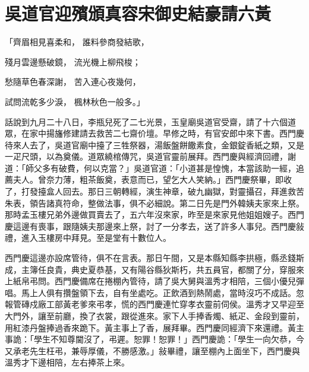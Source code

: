 %

\chapter{吳道官迎殯頒真容\KG 宋御史結豪請六黃}

「齊眉相見喜柔和，  誰料參商發結歌，

殘月雲邊懸破鏡，  流光機上柳飛梭；

愁隨草色春深謝，  苦入連心夜幾何，

試問流乾多少淚，  楓林秋色一般多。」

話說到九月二十八日，李瓶兒死了二七光景，玉皇廟吳道官受齋，請了十六個道眾，在家中揚旛修建請去救苦二七齋价壇。早修之時，有官安郎中來下書。西門慶待來人去了，吳道官廟中擡了三牲祭器，湯飯盤餅饊素食，金銀錠香紙之類，又是一疋尺頭，以為奠儀。道眾繞棺傳咒，吳道官靈前展拜。西門慶與經濟回禮，謝道：「師父多有破費，何以克當？」吳道官道：「小道甚是惶愧，本當該助一經，追薦夫人。曾奈力薄，粗茶飯奠，表意而已，望乞大人笑納。」西門慶祭畢，即收了，打發擡盒人回去。那日三朝轉經，演生神章，破九幽獄，對靈攝召，拜進救苦朱表，領告諸真符命，整做法事，俱不必細說。第二日先是門外韓姨夫家來上祭。那時孟玉樓兄弟外邊做買賣去了，五六年沒來家，昨至是來家見他姐姐嫂子。西門慶這邊有喪事，跟隨姨夫那邊來上祭，討了一分孝去，送了許多人事兒。西門慶敍禮，進入玉樓房中拜見。至是堂有十數位人。

西門慶這邊亦設席管待，俱不在言表。那日午間，又是本縣知縣李拱極，縣丞錢斯成，主簿任良貴，典史夏恭基，又有陽谷縣狄斯朽，共五員官，都關了分，穿服來上紙帛弔問。西門慶備席在捲棚內管待，請了吳大舅與溫秀才相陪，三個小優兒彈唱。馬上人俱有攢盤領下去，自有坐處吃。正飲酒到熱鬧處，當時沒巧不成話。忽報管磚戍廠工部黃老爹來弔孝，慌的西門慶連忙穿孝衣靈前伺侯。溫秀才又早迎至大門外，讓至前廳，換了衣裳，跟從進來。家下人手捧香燭、紙疋、金段到靈前，用紅漆丹盤捧過香來跪下。黃主事上了香，展拜畢。西門慶同經濟下來還禮。黃主事詭：「學生不知尊閫沒了，弔遲。恕罪！恕罪！」西門慶詭：「學生一向欠恭，今又承老先生枉弔，兼辱厚儀，不勝感激。」敍畢禮，讓至棚內上面坐下，西門慶與溫秀才下邊相陪，左右捧茶上來。

